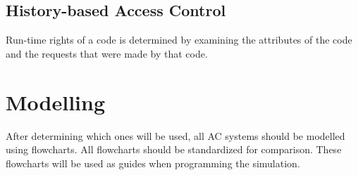 \documentclass[11pt]{article} %
\begin{document}
\subsection{History-based Access Control}

Run-time rights of a code is determined by examining the attributes of the code and the requests that were made by that code.


\section{Modelling}

After determining which ones will be used, all AC systems should be modelled using flowcharts.
All flowcharts should be standardized for comparison.
These flowcharts will be used as guides when programming the simulation.
\end{document}
